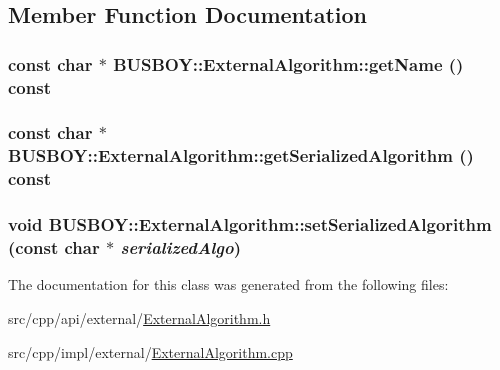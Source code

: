 \subsection{Member Function Documentation}
\hypertarget{classBUSBOY_1_1ExternalAlgorithm_afe228b27f0724f5cba056d0eaad726ac}{
\subsubsection[{getName}]{\setlength{\rightskip}{0pt plus 5cm}const char $\ast$ BUSBOY::ExternalAlgorithm::getName () const}}
\label{classBUSBOY_1_1ExternalAlgorithm_afe228b27f0724f5cba056d0eaad726ac}
\hypertarget{classBUSBOY_1_1ExternalAlgorithm_a0b2e2e8a8b94c2fd8a6bfb899b66c3b6}{
\subsubsection[{getSerializedAlgorithm}]{\setlength{\rightskip}{0pt plus 5cm}const char $\ast$ BUSBOY::ExternalAlgorithm::getSerializedAlgorithm () const}}
\label{classBUSBOY_1_1ExternalAlgorithm_a0b2e2e8a8b94c2fd8a6bfb899b66c3b6}
\hypertarget{classBUSBOY_1_1ExternalAlgorithm_a1a9df706c19bffdaea5b41b95e2ea06a}{
\subsubsection[{setSerializedAlgorithm}]{\setlength{\rightskip}{0pt plus 5cm}void BUSBOY::ExternalAlgorithm::setSerializedAlgorithm (const char $\ast$ {\em serializedAlgo})}}
\label{classBUSBOY_1_1ExternalAlgorithm_a1a9df706c19bffdaea5b41b95e2ea06a}


The documentation for this class was generated from the following files:\begin{DoxyCompactItemize}
\item 
src/cpp/api/external/\hyperlink{ExternalAlgorithm_8h}{ExternalAlgorithm.h}\item 
src/cpp/impl/external/\hyperlink{ExternalAlgorithm_8cpp}{ExternalAlgorithm.cpp}\end{DoxyCompactItemize}
